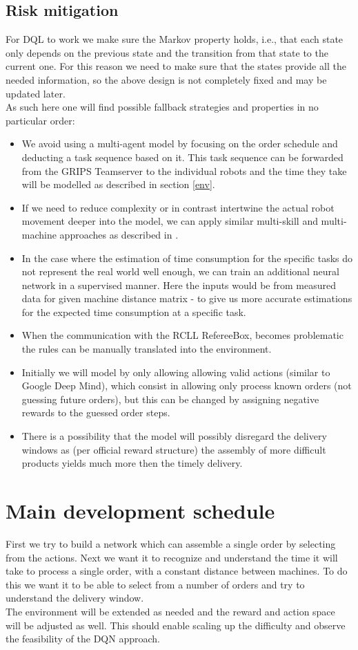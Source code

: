\documentclass[runningheads,envcountsect]{llncs}
\begin{document}
\subsection{Risk mitigation} \label{risks}
For DQL to work we make sure the Markov property holds, i.e., that each state only depends on the previous state and the transition from that state to the current one. For this reason we need to make sure that the states provide all the needed information, so the above design is not completely fixed and may be updated later.\\
As such here one will find possible fallback strategies and properties in no particular order:

\begin{itemize}
  \item We avoid using a multi-agent model by focusing on the order schedule and deducting a task sequence based on it. This task sequence can be forwarded from the GRIPS Teamserver to the individual robots and the time they take will be modelled as described in section \ref{env}.
  \item If we need to reduce complexity or in contrast intertwine the actual robot movement deeper into the model, we can apply similar multi-skill and multi-machine approaches as described in \cite{qu2016optimized}.
  \item In the case where the estimation of time consumption for the specific tasks do not represent the real world well enough, we can train an additional neural network in a supervised manner. Here the inputs would be from measured data for given machine distance matrix - to give us more accurate estimations for the expected time consumption at a specific task.
  \item When the communication with the RCLL RefereeBox, becomes problematic the rules can be manually translated into the environment.
  \item Initially we will model by only allowing allowing valid actions (similar to Google Deep Mind), which consist in allowing only process known orders (not guessing future orders), but this can be changed by assigning negative rewards to the guessed order steps.
  \item There is a possibility that the model will possibly disregard the delivery windows as (per official reward structure) the assembly of more difficult products yields much more then the timely delivery.
\end{itemize}


\section{Main development schedule}
First we try to build a network which can assemble a single order by selecting from the actions. Next we want it to recognize and understand the time it will take to process a single order, with a constant distance between machines. To do this we want it to be able to select from a number of orders and try to understand the delivery window.\\
The environment will be extended as needed and the reward and action space will be adjusted as well. This should enable scaling up the difficulty and observe the feasibility of the DQN approach.


\vspace{24pt}



\end{document}
